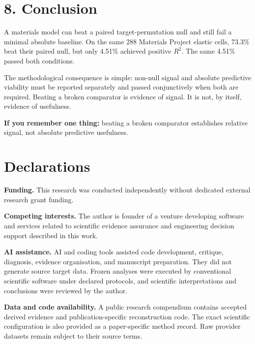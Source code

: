 \documentclass[10pt,a4paper]{article}
\begin{document}
\section{8. Conclusion}
A materials model can beat a paired target-permutation null and still fail a minimal absolute baseline. On the same 288 Materials Project elastic cells, 73.3\% beat their paired null, but only 4.51\% achieved positive $R^2$. The same 4.51\% passed both conditions.

The methodological consequence is simple: non-null signal and absolute predictive viability must be reported separately and passed conjunctively when both are required. Beating a broken comparator is evidence of signal. It is not, by itself, evidence of usefulness.

\textbf{If you remember one thing:} beating a broken comparator establishes relative signal, not absolute predictive usefulness.

\section*{Declarations}
\textbf{Funding.} This research was conducted independently without dedicated external research grant funding.

\textbf{Competing interests.} The author is founder of a venture developing software and services related to scientific evidence assurance and engineering decision support described in this work.

\textbf{AI assistance.} AI and coding tools assisted code development, critique, diagnosis, evidence organisation, and manuscript preparation. They did not generate source target data. Frozen analyses were executed by conventional scientific software under declared protocols, and scientific interpretations and conclusions were reviewed by the author.

\textbf{Data and code availability.} A public research compendium contains accepted derived evidence and publication-specific reconstruction code. The exact scientific configuration is also provided as a paper-specific method record. Raw provider datasets remain subject to their source terms.
\end{document}
